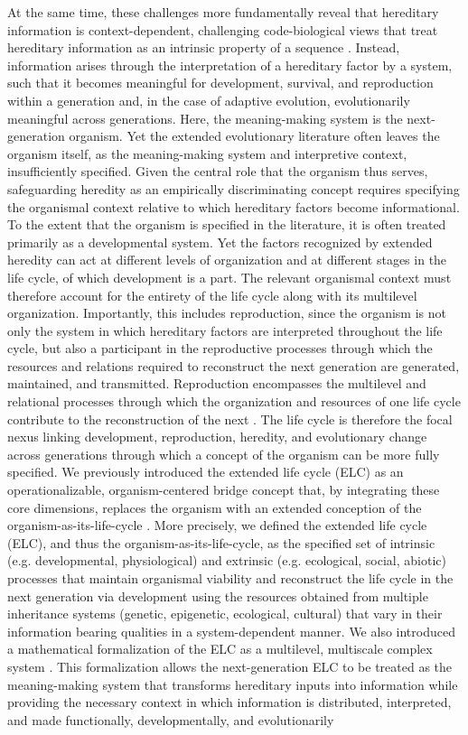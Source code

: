 \documentclass[pdflatex,sn-mathphys-num]{sn-jnl}
\theoremstyle{thmstylethree}
\theoremstyle{thmstyleone}
\begin{document}
At the same time, these challenges more fundamentally reveal that hereditary information is context-dependent, challenging code-biological views that treat hereditary information as an intrinsic property of a sequence \cite{maekivi2026methodological}. Instead, information arises through the interpretation of a hereditary factor by a system, such that it becomes meaningful for development, survival, and reproduction within a generation and, in the case of adaptive evolution, evolutionarily meaningful across generations. Here, the meaning-making system is the next-generation organism. Yet the extended evolutionary literature often leaves the organism itself, as the meaning-making system and interpretive context, insufficiently specified. Given the central role that the organism thus serves, safeguarding heredity as an empirically discriminating concept requires specifying the organismal context relative to which hereditary factors become informational. To the extent that the organism is specified in the literature, it is often treated primarily as a developmental system. Yet the factors recognized by extended heredity can act at different levels of organization and at different stages in the life cycle, of which development is a part. The relevant organismal context must therefore account for the entirety of the life cycle along with its multilevel organization. Importantly, this includes reproduction, since the organism is not only the system in which hereditary factors are interpreted throughout the life cycle, but also a participant in the reproductive processes through which the resources and relations required to reconstruct the next generation are generated, maintained, and transmitted. Reproduction encompasses the multilevel and relational processes through which the organization and resources of one life cycle contribute to the reconstruction of the next \cite{etxeberria2026expanded}. The life cycle is therefore the focal nexus linking development, reproduction, heredity, and evolutionary change across generations through which a concept of the organism can be more fully specified. We previously introduced the extended life cycle (ELC) as an operationalizable, organism-centered bridge concept that, by integrating these core dimensions, replaces the organism with an extended conception of the organism-as-its-life-cycle \cite{velezcruz2026elc}. More precisely, we defined the extended life cycle (ELC), and thus the organism-as-its-life-cycle, as the specified set of intrinsic (e.g. developmental, physiological) and extrinsic (e.g. ecological, social, abiotic) processes that maintain organismal viability and reconstruct the life cycle in the next generation via development using the resources obtained from multiple inheritance systems (genetic, epigenetic, ecological, cultural) that vary in their information bearing qualities in a system-dependent manner. We also introduced a mathematical formalization of the ELC as a multilevel, multiscale complex system \cite{velez2026extended}. This formalization allows the next-generation ELC to be treated as the meaning-making system that transforms hereditary inputs into information while providing the necessary context in which information is distributed, interpreted, and made functionally, developmentally, and evolutionarily 
\end{document}
